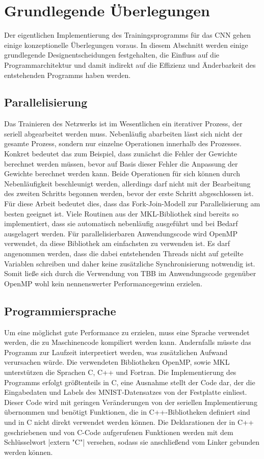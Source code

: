\documentclass[../main.tex]{subfiles}
\begin{document}
\section{Grundlegende Überlegungen}
Der eigentlichen Implementierung des Trainingsprogramms für das CNN gehen einige konzeptionelle Überlegungen voraus. In diesem Abschnitt werden einige grundlegende Designentscheidungen festgehalten, die Einfluss auf die Programmarchitektur und damit indirekt auf die Effizienz und Änderbarkeit des entstehenden Programms haben werden. 

\subsection{Parallelisierung}
Das Trainieren des Netzwerks ist im Wesentlichen ein iterativer Prozess, der seriell abgearbeitet werden muss. Nebenläufig abarbeiten lässt sich nicht der gesamte Prozess, sondern nur einzelne Operationen innerhalb des Prozesses. Konkret bedeutet das zum Beispiel, dass zunächst die Fehler der Gewichte berechnet werden müssen, bevor auf Basis dieser Fehler die Anpassung der Gewichte berechnet werden kann. Beide Operationen für sich können durch Nebenläufigkeit beschleunigt werden, allerdings darf nicht mit der Bearbeitung des zweiten Schritts begonnen werden, bevor der erste Schritt abgeschlossen ist. Für diese Arbeit bedeutet dies, dass das Fork-Join-Modell zur Parallelisierung am besten geeignet ist. Viele Routinen aus der MKL-Bibliothek sind bereits so implementiert, dass sie automatisch nebenläufig ausgeführt und bei Bedarf ausgelagert werden. Für parallelisierbaren Anwendungscode wird OpenMP verwendet, da diese Bibliothek am einfachsten zu verwenden ist. Es darf angenommen werden, dass die dabei entstehenden Threads nicht auf geteilte Variablen schreiben und daher keine zusätzliche Synchronisierung notwendig ist. Somit ließe sich durch die Verwendung von TBB im Anwendungscode gegenüber OpenMP wohl kein nennenswerter Performancegewinn erzielen. 

\subsection{Programmiersprache}
Um eine möglichst gute Performance zu erzielen, muss eine Sprache verwendet werden, die zu Maschinencode kompiliert werden kann. Andernfalls müsste das Programm zur Laufzeit interpretiert werden, was zusätzlichen Aufwand verursachen würde. Die verwendeten Bibliotheken OpenMP, sowie MKL unterstützen die Sprachen C, C++ und Fortran. Die Implementierung des Programms erfolgt größtenteils in C, eine Ausnahme stellt der Code dar, der die Eingabedaten und Labels des MNIST-Datensatzes von der Festplatte einliest. Dieser Code wird mit geringen Veränderungen von der seriellen Implementierung übernommen und benötigt Funktionen, die in C++-Bibliotheken definiert sind und in C nicht direkt verwendet werden können. Die Deklarationen der in C++ geschriebenen und von C-Code aufgerufenen Funktionen werden mit dem Schlüsselwort |extern "C"| versehen, sodass sie anschließend vom Linker gebunden werden können. 
\end{document}
